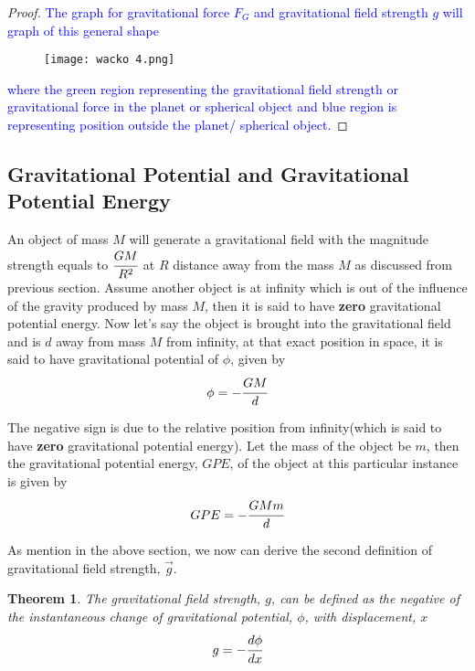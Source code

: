 \documentclass{article}
\newtheorem{theorem}{Theorem}[subsection]
\begin{document}
\begin{proof}
\textcolor{blue}{The graph for gravitational force $F_G$ and gravitational field strength $g$ will graph of this general shape }
\begin{figure}[H]
    \centering
    \texttt{[image: wacko 4.png]}
\end{figure}
\textcolor{blue}{where the green region representing the gravitational field strength or gravitational force in the planet or spherical object and blue region is representing position outside the planet/ spherical object.}
\end{proof}

     \subsection{Gravitational Potential and Gravitational Potential Energy}


An object of mass $M$ will generate a gravitational field with the magnitude strength equals to $\cfrac{GM}{R^2}$ at $R$ distance away from the mass $M$ as discussed from previous section. Assume another object is at infinity which is out of the influence of the gravity produced by mass $M$, then it is said to have \textbf{zero} gravitational potential energy. Now let's say the object is brought into the gravitational field and is $d$ away from mass $M$ from infinity, at that exact position in space, it is said to have gravitational potential of $\phi$, given by 
$$\phi=-\cfrac{GM}{d}$$

The negative sign is due to the relative position from infinity(which is said to have \textbf{zero} gravitational potential energy). Let the mass of the object be $m$, then the gravitational potential energy, $GPE$, of the object at this particular instance is given by
$$GPE=-\cfrac{GMm}{d}$$

As mention in the above section, we now can derive the second definition of gravitational field strength, $\vec{g}$. 

\begin{theorem}
The gravitational field strength, $g$, can be defined as the negative of the instantaneous change of gravitational potential, $\phi$, with displacement, $x$
$$g=-\cfrac{d\phi}{dx}$$
\end{theorem}
\end{document}
